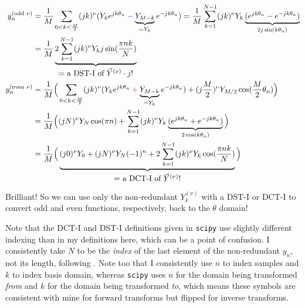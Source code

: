\documentclass[10pt]{article}
\begin{document}
\begin{align}
y_n^{(\text{odd } \nu)} &= \frac{1}{M} \sum_{0 < k < \frac{M}{2}} (jk)^\nu (Y_k e^{jk\theta_n} \color{blue}-\color{black} \underbrace{Y_{M-k}}_{= Y_k} e^{-jk\theta_n}) = \frac{1}{M} \sum_{k=1}^{N-1} (jk)^\nu Y_k \underbrace{(e^{jk\theta_n} - e^{-jk\theta_n})}_{2j\sin(k\theta_n)} \notag \\
&= \frac{1}{M} \underbrace{2 \sum_{k=1}^{N-1} (jk)^\nu Y_k j \sin(\frac{\pi nk}{N})}_{\text{\normalsize = a DST-I of $\vec{Y}^{(\nu)} \cdot j$!}} \label{y_prime_odd}\\
y_n^{(\text{even } \nu)} &= \frac{1}{M} \Big( \sum_{0 < k < \frac{M}{2}} (jk)^\nu (Y_k e^{jk\theta_n} \color{red}+\color{black} \underbrace{Y_{M-k}}_{= Y_k} e^{-jk\theta_n}) + (j\frac{M}{2})^\nu Y_{M/2} \cos(\frac{M}{2}\theta_n) \Big) \notag \\
&= \frac{1}{M} \Big( (jN)^\nu Y_N \cos(\pi n) + \sum_{k=1}^{N-1} (jk)^\nu Y_k \underbrace{(e^{jk\theta_n} + e^{-jk\theta_n})}_{2\cos(k\theta_n)} \Big) \notag \\
&= \frac{1}{M} \Big( \underbrace{(j0)^\nu Y_0 + (jN)^\nu Y_N (-1)^n + 2 \sum_{k=1}^{N-1} (jk)^\nu Y_k \cos(\frac{\pi nk}{N})}_{\text{\normalsize = a DCT-I of $\vec{Y}^{(\nu)}$!}} \Big) \label{y_prime_even}
\end{align}

Brilliant! So we can use only the non-redundant $Y_k^{(\nu)}$ with a DST-I or DCT-I to convert odd and even functions, respectively, back to the $\theta$ domain!

Note that the DCT-I and DST-I definitions given in \texttt{scipy}\cite{dct}\cite{dst} use slightly different indexing than in my definitions here, which can be a point of confusion. I consistently take $N$ to be the \textit{index} of the last element of the non-redundant $y_n$, not its length, following \cite{trefethen8}. Note too that I consistently use $n$ to index samples and $k$ to index basis domain, whereas \texttt{scipy} uses $n$ for the domain being transformed \textit{from} and $k$ for the domain being transformed \textit{to}, which means these symbols are consistent with mine for forward transforms but flipped for inverse transforms.
\end{document}
